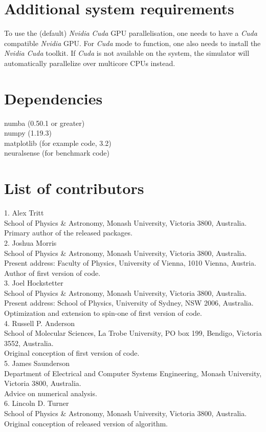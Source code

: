 \documentclass{jors}
\begin{document}
\section{Additional system requirements}
To use the (default) \emph{Nvidia Cuda} GPU parallelisation, one needs to have a \emph{Cuda} compatible \emph{Nvidia} GPU\cite{noauthor_cuda_2012}.
For \emph{Cuda} mode to function, one also needs to install the \emph{Nvidia Cuda} toolkit\cite{noauthor_cuda_2013}.
If \emph{Cuda} is not available on the system, the simulator will automatically parallelize over multicore CPUs instead.

\section{Dependencies}
numba (0.50.1 or greater)\\
numpy (1.19.3)\\
matplotlib (for example code, 3.2)\\
neuralsense (for benchmark code)

\section{List of contributors}

1. Alex Tritt\\
	School of Physics \& Astronomy, Monash University, Victoria 3800, Australia.\\
	Primary author of the released packages.\\
2. Joshua Morris\\
	School of Physics \& Astronomy, Monash University, Victoria 3800, Australia.\\
	Present address: Faculty of Physics, University of Vienna, 1010 Vienna, Austria.\\
	Author of first version of code.\\
3. Joel Hockstetter\\
	School of Physics \& Astronomy, Monash University, Victoria 3800, Australia.\\
	Present address: School of Physics, University of Sydney, NSW 2006, Australia.\\
	Optimization and extension to spin-one of first version of code.\\
4. Russell P. Anderson\\
	School of Molecular Sciences, La Trobe University, PO box 199, Bendigo, Victoria 3552, Australia.\\
	Original conception of first version of code.\\
5. James Saunderson\\
	Department of Electrical and Computer Systems Engineering, Monash University, Victoria 3800, Australia.\\
	Advice on numerical analysis.\\
6. Lincoln D. Turner\\
	School of Physics \& Astronomy, Monash University, Victoria 3800, Australia.\\
	Original conception of released version of algorithm.
\end{document}
